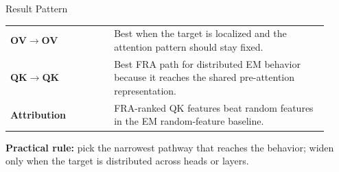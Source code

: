 \documentclass[final]{article}
\begin{document}
\begin{minipage}[t][\dimexpr\textheight-5.2in\relax][t]{0.318\textwidth}
\vspace{0.20in}
\begin{posterbox}[colframe=steerC!55]{Result Pattern}
\begin{tabular}{>{\bfseries}p{0.30\linewidth}p{0.62\linewidth}}
OV$\to$OV & Best when the target is localized and the attention pattern should stay fixed. \\
QK$\to$QK & Best FRA path for distributed EM behavior because it reaches the shared pre-attention representation. \\
Attribution & FRA-ranked QK features beat random features in the EM random-feature baseline. \\
\end{tabular}

\vspace{0.12in}
\textbf{Practical rule:} pick the narrowest pathway that reaches the behavior; widen only when the target is distributed across heads or layers.
\end{posterbox}

\end{minipage}
\end{document}
